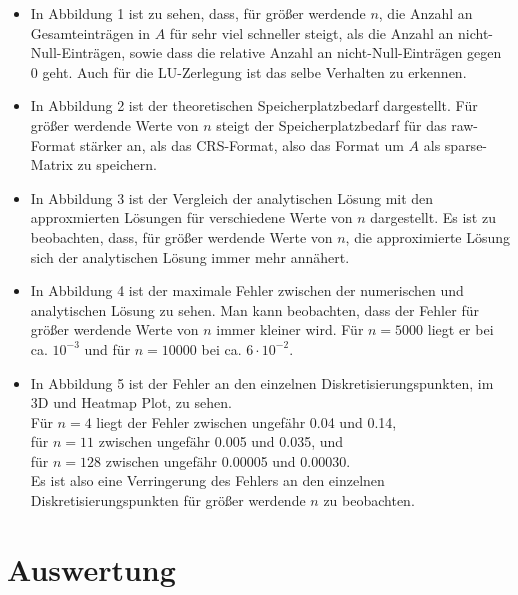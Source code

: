 \documentclass{scrartcl}
\theoremstyle{remark}
\begin{document}
\begin{itemize}
  \item In Abbildung 1 
        ist zu sehen, dass, für größer werdende \(n\), die Anzahl an Gesamteinträgen in \(A\) für sehr viel schneller steigt, als die Anzahl an nicht-Null-Einträgen,
        sowie dass die relative Anzahl an nicht-Null-Einträgen gegen 0 geht.
        Auch für die LU-Zerlegung ist das selbe Verhalten zu erkennen.


  \item In Abbildung 2
        ist der theoretischen Speicherplatzbedarf dargestellt. Für größer werdende Werte von \(n\) steigt der Speicherplatzbedarf für das raw-Format
        stärker an, als das CRS-Format, also das Format um \(A\) als sparse-Matrix zu speichern.

  \item In Abbildung 3
        ist der Vergleich der analytischen Lösung mit den approxmierten Lösungen für verschiedene Werte von \(n\) dargestellt.
        Es ist zu beobachten, dass, für größer werdende Werte von \(n\), die approximierte Lösung sich der analytischen Lösung immer mehr annähert.

  \item In Abbildung 4
        ist der maximale Fehler zwischen der numerischen und analytischen Lösung zu sehen.
        Man kann beobachten, dass der Fehler für größer werdende Werte von \(n\) immer kleiner wird.
        Für \(n = 5000\) liegt er bei ca. \(10^{-3}\) und
        für \(n = 10000\) bei ca. \(6 \cdot 10^{-2}\). 


  \item In Abbildung 5
        ist der Fehler an den einzelnen Diskretisierungspunkten, im 3D und Heatmap Plot, zu sehen. \\
        Für \(n = 4\) liegt der Fehler zwischen ungefähr 0.04 und 0.14, \\
        für \(n = 11\) zwischen ungefähr 0.005 und 0.035, und \\
        für \(n = 128\) zwischen ungefähr 0.00005 und 0.00030. \\
        Es ist also eine Verringerung des Fehlers an den einzelnen Diskretisierungspunkten für größer werdende \(n\) zu beobachten.
\end{itemize}



\section{Auswertung}
\end{document}
